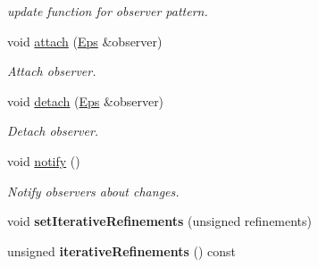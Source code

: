 \begin{DoxyCompactItemize}
\begin{DoxyCompactList}\small\item\em update function for observer pattern. \end{DoxyCompactList}\item 
\hypertarget{classSpacy_1_1Mixin_1_1MixinConnection_abb5520ee6b22dd993d78f142939a1ed4}{}void \hyperlink{classSpacy_1_1Mixin_1_1MixinConnection_abb5520ee6b22dd993d78f142939a1ed4}{attach} (\hyperlink{classSpacy_1_1Mixin_1_1Eps_a51dbe0b9cc950e0f3dfd34a481f08ae4}{Eps} \&observer)\label{classSpacy_1_1Mixin_1_1MixinConnection_abb5520ee6b22dd993d78f142939a1ed4}

\begin{DoxyCompactList}\small\item\em Attach observer. \end{DoxyCompactList}\item 
\hypertarget{classSpacy_1_1Mixin_1_1MixinConnection_adda739590c487679c26f60e50aedb73f}{}void \hyperlink{classSpacy_1_1Mixin_1_1MixinConnection_adda739590c487679c26f60e50aedb73f}{detach} (\hyperlink{classSpacy_1_1Mixin_1_1Eps_a51dbe0b9cc950e0f3dfd34a481f08ae4}{Eps} \&observer)\label{classSpacy_1_1Mixin_1_1MixinConnection_adda739590c487679c26f60e50aedb73f}

\begin{DoxyCompactList}\small\item\em Detach observer. \end{DoxyCompactList}\item 
\hypertarget{classSpacy_1_1Mixin_1_1MixinConnection_a1ddeaa78a3bb4a38c2cca36d1f99fe36}{}void \hyperlink{classSpacy_1_1Mixin_1_1MixinConnection_a1ddeaa78a3bb4a38c2cca36d1f99fe36}{notify} ()\label{classSpacy_1_1Mixin_1_1MixinConnection_a1ddeaa78a3bb4a38c2cca36d1f99fe36}

\begin{DoxyCompactList}\small\item\em Notify observers about changes. \end{DoxyCompactList}\item 
\hypertarget{classSpacy_1_1Mixin_1_1IterativeRefinements_afd8815d6932a99b1700f54162d9f633e}{}void {\bfseries set\+Iterative\+Refinements} (unsigned refinements)\label{classSpacy_1_1Mixin_1_1IterativeRefinements_afd8815d6932a99b1700f54162d9f633e}

\item 
\hypertarget{classSpacy_1_1Mixin_1_1IterativeRefinements_a560cd9428928c941765b71dd7c51ae3b}{}unsigned {\bfseries iterative\+Refinements} () const \label{classSpacy_1_1Mixin_1_1IterativeRefinements_a560cd9428928c941765b71dd7c51ae3b}


\end{DoxyCompactItemize}

